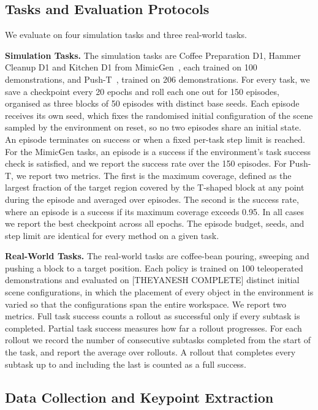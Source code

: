 \documentclass[letterpaper, 10 pt, conference]{ieeeconf}  %
\begin{document}
\subsection{Tasks and Evaluation Protocols}

We evaluate on four simulation tasks and three real-world tasks.

\textbf{Simulation Tasks.} The simulation tasks are Coffee Preparation D1, Hammer Cleanup D1 and Kitchen D1 from MimicGen~\cite{mimicgen}, each trained on 100 demonstrations, and Push-T~\cite{chi2023diffusionpolicy}, trained on 206 demonstrations. For every task, we save a checkpoint every 20 epochs and roll each one out for 150 episodes, organised as three blocks of 50 episodes with distinct base seeds. Each episode receives its own seed, which fixes the randomised initial configuration of the scene sampled by the environment on reset, so no two episodes share an initial state. An episode terminates on success or when a fixed per-task step limit is reached. For the MimicGen tasks, an episode is a success if the environment's task success check is satisfied, and we report the success rate over the 150 episodes. For Push-T, we report two metrics. The first is the maximum coverage, defined as the largest fraction of the target region covered by the T-shaped block at any point during the episode and averaged over episodes. The second is the success rate, where an episode is a success if its maximum coverage exceeds 0.95. In all cases we report the best checkpoint across all epochs. The episode budget, seeds, and step limit are identical for every method on a given task.

\textbf{Real-World Tasks.} The real-world tasks are coffee-bean pouring, sweeping and pushing a block to a target position. Each policy is trained on 100 teleoperated demonstrations and evaluated on [THEYANESH COMPLETE] distinct initial scene configurations, in which the placement of every object in the environment is varied so that the configurations span the entire workspace. We report two metrics. Full task success counts a rollout as successful only if every subtask is completed. Partial task success measures how far a rollout progresses. For each rollout we record the number of consecutive subtasks completed from the start of the task, and report the average over rollouts. A rollout that completes every subtask up to and including the last is counted as a full success.

\subsection{Data Collection and Keypoint Extraction}
\end{document}

